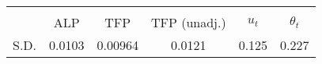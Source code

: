 \begin{tabular}{l*{1}{ccccc}}
\toprule
                &\multicolumn{5}{c}{}                             \\
                &ALP&TFP&TFP (unadj.)&$ u_t $&$\theta_t $\\
\midrule
S.D.              &   0.0103&  0.00964&   0.0121&    0.125&    0.227\\
\bottomrule
\end{tabular}

